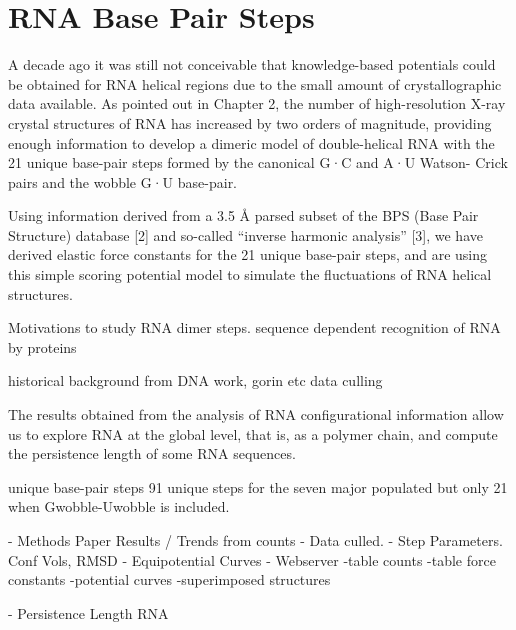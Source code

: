 \chapter{RNA Base Pair Steps}
\label{basepairsteps} 

A decade ago it was still not conceivable that knowledge-based
potentials could be obtained for RNA helical regions due to the small
amount of crystallographic data available. As pointed out in Chapter
2, the number of high-resolution
X-ray crystal structures of RNA has increased by two orders of
magnitude,  providing enough information to develop a dimeric model
of double-helical RNA with the 21 unique base-pair steps formed by the
canonical G·C and A·U Watson- Crick pairs and the wobble G·U
base-pair.

Using information derived from a 3.5 Å parsed subset of the
BPS (Base Pair Structure) database [2] and so-called “inverse harmonic
analysis” [3], we have derived elastic force constants for the 21
unique base-pair steps, and are using this simple scoring potential
model to simulate the fluctuations of RNA helical structures.





Motivations to study RNA dimer steps.
sequence dependent recognition of RNA by proteins



historical background from DNA work, gorin etc
data culling


The   results  obtained   from  the  analysis   of  RNA
configurational  information allow  us to  explore RNA  at  the global
level, that is, as a polymer chain, and compute the persistence length
of some RNA sequences.






unique base-pair steps
91 unique steps for the seven major populated but only 21 when
Gwobble-Uwobble is included.

- Methods Paper Results / Trends from counts
  - Data culled.
- Step Parameters. Conf Vols, RMSD
- Equipotential Curves
- Webserver
  -table counts
  -table force constants
  -potential curves
  -superimposed structures
  


- Persistence Length RNA






